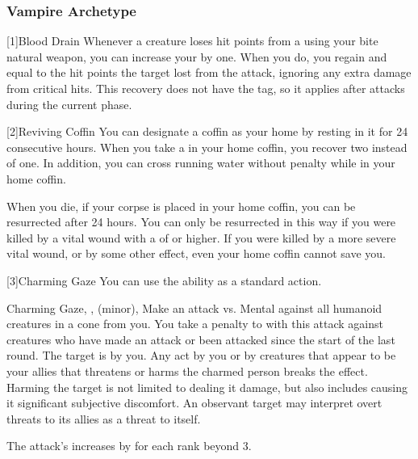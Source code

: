         \subsubsection{Vampire Archetype}

            [1]{Blood Drain} Whenever a creature loses hit points from a  using your bite natural weapon, you can increase your  by one.
            When you do, you regain  and  equal to the hit points the target lost from the attack, ignoring any extra damage from critical hits.
            This recovery does not have the  tag, so it applies after attacks during the current phase.

            [2]{Reviving Coffin} You can designate a coffin as your home by resting in it for 24 consecutive hours.
            When you take a  in your home coffin, you recover two  instead of one.
            In addition, you can cross running water without penalty while in your home coffin.

            When you die, if your corpse is placed in your home coffin, you can be resurrected after 24 hours.
            You can only be resurrected in this way if you were killed by a vital wound with a  of  or higher.
            If you were killed by a more severe vital wound, or by some other effect, even your home coffin cannot save you.

            [3]{Charming Gaze} You can use the  ability as a standard action.
            \begin{magicalsustainability}{Charming Gaze}{, ,  (minor), }
                \rankline
                Make an attack vs. Mental against all humanoid creatures in a \largearea cone from you.
                You take a  penalty to  with this attack against creatures who have made an attack or been attacked since the start of the last round.
                \hit The target is \charmed by you.
                Any act by you or by creatures that appear to be your allies that threatens or harms the charmed person breaks the effect.
                Harming the target is not limited to dealing it damage, but also includes causing it significant subjective discomfort.
                An observant target may interpret overt threats to its allies as a threat to itself.

                \rankline

                \noindent The attack's  increases by  for each rank beyond 3.
            \end{magicalsustainability}

